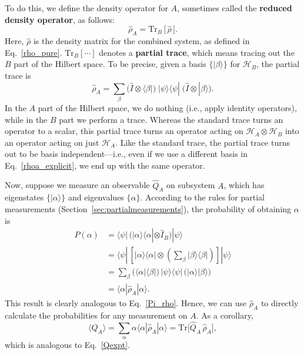 \documentclass[prx,12pt]{revtex4-2}
\begin{document}
To do this, we define the density operator for $A$, sometimes called
the \textbf{reduced density operator}, as follows:
\begin{equation}
  \hat{\rho}_A = \mathrm{Tr}_B \,\big[\,\hat{\rho}\,\big].
  \label{rhoa_def}
\end{equation}
Here, $\hat{\rho}$ is the density matrix for the combined system, as
defined in Eq.~\eqref{rho_pure}.  $\mathrm{Tr}_B[\cdots]$ denotes a
\textbf{partial trace}, which means tracing out the $B$ part of the
Hilbert space.  To be precise, given a basis $\{|\beta\rangle\}$ for
$\mathscr{H}_B$, the partial trace is
\begin{equation}
  \hat{\rho}_A =
    \sum_\beta
    \Big( \hat{I}\otimes \langle \beta| \Big)
    \; |\psi\rangle \langle \psi | \;
    \Big( \hat{I}\otimes | \beta\rangle \Big).
    \label{rhoa_explicit}
\end{equation}
In the $A$ part of the Hilbert space, we do nothing (i.e., apply
identity operators), while in the $B$ part we perform a trace.
Whereas the standard trace turns an operator to a scalar, this partial
trace turns an operator acting on $\mathscr{H}_A \otimes
\mathscr{H}_B$ into an operator acting on just $\mathscr{H}_A$.  Like
the standard trace, the partial trace turns out to be basis
independent---i.e., even if we use a different basis in
Eq.~\eqref{rhoa_explicit}, we end up with the same operator.

Now, suppose we measure an observable $\hat{Q}_A$ on subsystem $A$,
which has eigenstates $\{|\alpha\rangle\}$ and eigenvalues
$\{\alpha\}$.  According to the rules for partial measurements
(Section~\ref{sec:partialmeasurements}), the probability of obtaining
$\alpha$ is
\begin{align}
  P(\alpha)
    &=
    \langle \psi | \,
    \Big( |\alpha\rangle \langle \alpha| \otimes \hat{I}_B\Big) |\psi\rangle \\
    &=
    \langle \psi | \,
    \left[ |\alpha\rangle \langle \alpha| \otimes
      \left(\sum_\beta | \beta\rangle \langle \beta|\right) \right]
    |\psi\rangle \\
    &=
    \sum_\beta
    \Big( \langle \alpha| \langle \beta| \Big)
    \, |\psi\rangle \langle \psi | \,
    \Big( |\alpha\rangle | \beta\rangle \Big) \\
    &= \langle \alpha | \hat{\rho}_A | \alpha \rangle.
    \label{rho_prob}
\end{align}
This result is clearly analogous to Eq.~\eqref{Pi_rho}.  Hence, we can
use $\hat{\rho}_A$ to directly calculate the probabilities for any
measurement on $A$.  As a corollary,
\begin{equation}
  \langle Q_A \rangle = \sum_\alpha \alpha
  \langle \alpha | \hat{\rho}_A | \alpha \rangle
  = \mathrm{Tr}\Big[\hat{Q}_A \, \hat{\rho}_A \Big],
  \label{rho_expect}
\end{equation}
which is analogous to Eq.~\eqref{Qexpt}.
    
\end{document}
